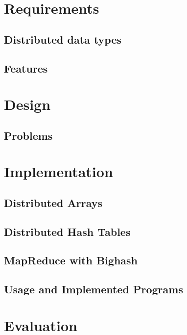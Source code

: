\section{Requirements}
\subsection{Distributed data types}
\subsection{Features}
\section{Design}
\subsection{Problems}
\section{Implementation}
\subsection{Distributed Arrays}
\subsection{Distributed Hash Tables}
\subsection{MapReduce with Bighash}
\subsection{Usage and Implemented Programs}
\subsection{}
\section{Evaluation}